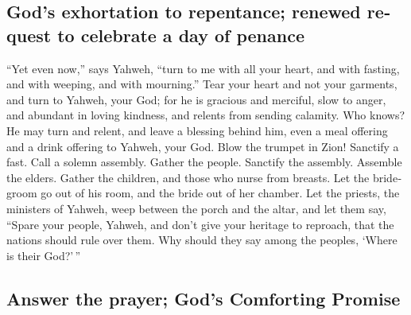 \begin{paracol}{2}
\begin{otherlanguage}{english}
{\subsection{God's exhortation to repentance; renewed request to
celebrate a day of
penance}\label{gods-exhortation-to-repentance-renewed-request-to-celebrate-a-day-of-penance}}

 ``Yet even now,'' says Yahweh, ``turn to me with all
your heart, and with fasting, and with weeping, and with mourning.''
 Tear your heart and not your garments, and turn to
Yahweh, your God; for he is gracious and merciful, slow to anger, and
abundant in loving kindness, and relents from sending calamity.
 Who knows? He may turn and relent, and leave a blessing
behind him, even a meal offering and a drink offering to Yahweh, your
God.  Blow the trumpet in Zion! Sanctify a fast. Call a
solemn assembly.  Gather the people. Sanctify the
assembly. Assemble the elders. Gather the children, and those who nurse
from breasts. Let the bridegroom go out of his room, and the bride out
of her chamber.  Let the priests, the ministers of
Yahweh, weep between the porch and the altar, and let them say, ``Spare
your people, Yahweh, and don't give your heritage to reproach, that the
nations should rule over them. Why should they say among the peoples,
`Where is their God?'\,''

\hypertarget{answer-the-prayer-gods-comforting-promise}{%
\subsection{Answer the prayer; God's Comforting
Promise}\label{answer-the-prayer-gods-comforting-promise}}


\end{otherlanguage}
\end{paracol}
